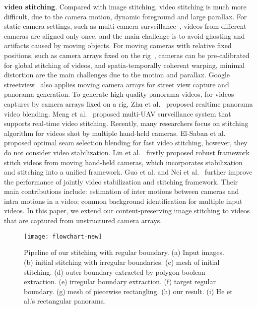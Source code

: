 \documentclass[10pt,journal,compsoc]{IEEEtran}
\begin{document}
\textbf{video stitching}.
Compared with image stitching, video stitching is much more difficult, due to the camera motion, dynamic foreground and large parallax.
For static camera settings, such as multi-camera surveillance~\cite{journals/sensors/HeY16,journals/itiis/YinLWLZ14},  videos from different cameras are aligned only once, and the main challenge is to avoid ghosting and artifacts caused by moving objects.
For moving cameras with relative fixed positions, such as camera arrays fixed on the rig~\cite{journals/cgf/PerazziSZKWWG15}, cameras can be pre-calibrated for global stitching of videos, and spatia-temporally coherent warping, minimal distortion are the main challenges due to the motion and parallax.
Google streetview~\cite{journals/computer/AnguelovDFFLLOVW10} also applies moving camera arrays for street view capture and panorama generation.
To generate high-quality panorama videos, for videos captures by camera arrays fixed on a rig, Zhu et al.~\cite{journals/tip/ZhuLWZMLH18} proposed realtime panorama video blending.
Meng et al.~\cite{conf/mm/MengWL15} proposed multi-UAV surveillance system that supports real-time video stitching.
Recently, many researchers focus on stitching algorithm for videos shot by multiple hand-held cameras.
El-Saban et al.~\cite{conf/icip/El-SabanEKR11} proposed optimal seam selection blending for fast video stitching, however, they do not consider video stabilization.
Lin et al.~\cite{journals/cgf/LinLCZ16} firstly proposed robust framework stitch videos from moving hand-held cameras, which incorporates stabilization and stitching into a unified framework.
Guo et al. and Nei et al.~\cite{journals/tip/GuoLHZZG16,journals/tip/NieSZSL18} further improve the performance of  jointly video stabilization and stitching framework.
Their main contributions include: estimation of inter motions between cameras and intra motions in a video; common background identification for multiple input videos.
In this paper, we extend our content-preserving image stitching to videos that are captured from unstructured camera arrays\cite{journals/cgf/PerazziSZKWWG15}.

\begin{figure*}[t] %
  \centering
  \texttt{[image: flowchart-new]}
  \caption{Pipeline of  our stitching with regular boundary. (a) Input images. (b) initial stitching with irregular boundaries. (c) mesh of initial stitching. (d) outer boundary extracted by polygon boolean extraction. (e) irregular boundary extraction. (f) target regular boundary. (g) mesh of piecewise rectangling. (h) our result. (i) He et al.'s rectangular panorama.} \label{fig:pipeline}
\end{figure*}
\end{document}
